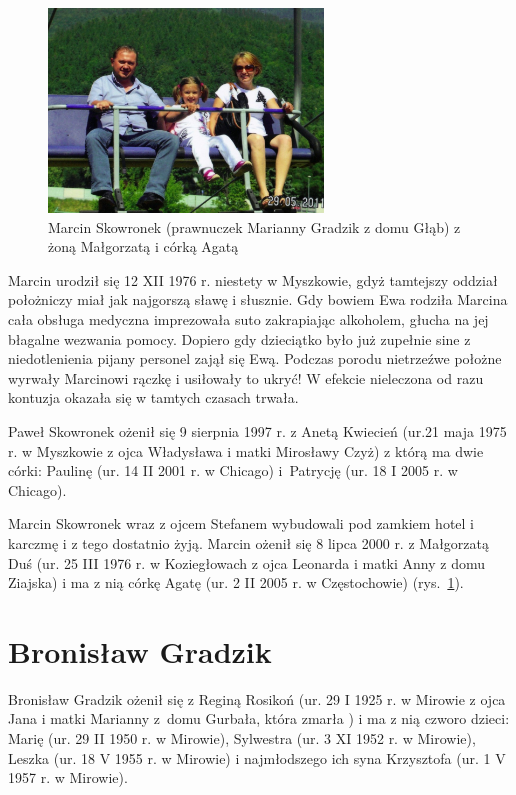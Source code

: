 \begin{figure}[!b]
\begin{center}
\includegraphics[width=0.65\textwidth]{zdjecia/malgorzata_marcin_agata_skowronek.jpg}
\caption[Rodzina Marcina Skowronka]{Marcin Skowronek (prawnuczek Marianny Gradzik z domu Głąb) z żoną Małgorzatą i córką Agatą}
\label{rys:malgorzata_marcin_agata_skowronek}
\end{center}
\end{figure}

Marcin urodził się 12 XII 1976 r. niestety w Myszkowie, gdyż tamtejszy oddział położniczy miał jak najgorszą sławę i słusznie. Gdy bowiem Ewa rodziła Marcina cała obsługa medyczna imprezowała suto zakrapiając alkoholem, głucha na jej błagalne wezwania pomocy. Dopiero gdy dzieciątko było już zupełnie sine z niedotlenienia pijany personel zajął się Ewą. Podczas porodu nietrzeźwe położne wyrwały Marcinowi rączkę i usiłowały to ukryć! W efekcie nieleczona od razu kontuzja okazała się w tamtych czasach  trwała.

Paweł Skowronek ożenił się 9 sierpnia 1997 r. z Anetą Kwiecień (ur.21 maja 1975 r. w Myszkowie z ojca Władysława i matki Mirosławy Czyż) z którą ma dwie córki: Paulinę (ur. 14 II 2001 r. w Chicago) i~Patrycję  (ur. 18 I 2005 r. w Chicago).

Marcin Skowronek wraz z ojcem Stefanem wybudowali pod zamkiem hotel i karczmę i z tego dostatnio żyją. Marcin ożenił się 8 lipca 2000 r. z Małgorzatą Duś (ur. 25  III 1976 r. w Koziegłowach z ojca Leonarda i matki Anny z domu Ziajska) i ma z nią córkę Agatę (ur. 2 II 2005 r. w Częstochowie) (rys.~\ref{rys:malgorzata_marcin_agata_skowronek}).


\section{Bronisław Gradzik}
Bronisław Gradzik ożenił się z Reginą Rosikoń (ur. 29 I 1925 r. w Mirowie z ojca Jana i matki Marianny z~domu Gurbała, która zmarła ) i ma z nią czworo dzieci: Marię (ur. 29 II 1950 r. w Mirowie), Sylwestra (ur. 3 XI 1952 r. w Mirowie), Leszka (ur. 18 V 1955 r. w Mirowie) i najmłodszego ich syna Krzysztofa (ur. 1 V 1957 r. w Mirowie). 

